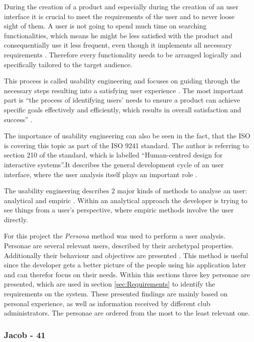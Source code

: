 During the creation of a product and especially during the creation of an user interface it is crucial to meet the requirements of the user and to never loose sight of them. A user is not going to spend much time on searching functionalities, which means he might be less satisfied with the product and consequentially use it less frequent, even though it implements all necessary requirements \cite{Frank:2013aa}. Therefore every functionality needs to be arranged logically and specifically tailored to the target audience.

This process is called usability engineering and focuses on guiding through the necessary steps resulting into a satisfying user experience \cite{Nielsen:1993aa}. The most important part is \enquote{the process of identifying users’ needs to ensure a product can achieve specific goals effectively and efficiently, which results in overall satisfaction and success} \cite{Frank:2013aa}.

The importance of usability engineering can also be seen in the fact, that the \gls{ISO} is covering this topic as part of the ISO 9241 standard. The author is referring to section 210 of the standard, which is labelled \enquote{Human-centred design for interactive systems}.It describes the general development cycle of an user interface, where the user analysis itself plays an important role \cite[p. 13]{Gulzow:2015aa}.

The usability engineering describes 2 major kinds of methods to analyse an user: analytical and empiric \cite[p. 20]{Gulzow:2015aa}. Within an analytical approach the developer is trying to see things from a user's perspective, where empiric methods involve the user directly. 

For this project the \emph{Persona} method was used to perform a user analysis. Personae are several relevant users, described by their archetypal properties. Additionally their behaviour and objectives are presented \cite[p. 30]{Gulzow:2015aa}. This method is useful since the developer gets a better picture of the people using his application later and can therefor focus on their needs. Within this sections three key personae are presented, which are used in section \vref{sec:Requirements} to identify the requirements on the system. These presented findings are mainly based on personal experience, as well as information received by different club administrators. The personae are ordered from the most to the least relevant one.

\subsubsection{Jacob - 41}
\label{sec:Jacob}

